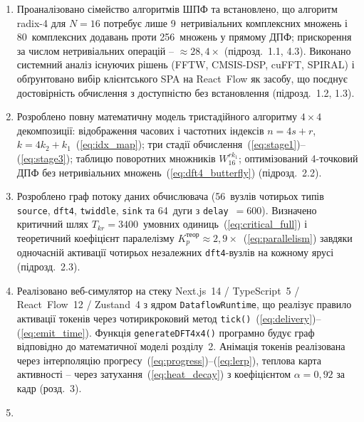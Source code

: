\documentclass[
]{article}
\begin{document}
\begin{enumerate}
\def\labelenumi{\arabic{enumi}.}
\item
  Проаналізовано сімейство алгоритмів ШПФ та встановлено, що алгоритм
  radix-4 для \(N = 16\) потребує лише 9~нетривіальних комплексних
  множень і 80~комплексних додавань проти 256~множень у прямому ДПФ;
  прискорення за числом нетривіальних операцій --
  \(\approx 28,4 \times\) (підрозд.~1.1, 4.3). Виконано системний аналіз
  існуючих рішень (FFTW, CMSIS-DSP, cuFFT, SPIRAL) і обґрунтовано вибір
  клієнтського SPA на React~Flow як засобу, що поєднує достовірність
  обчислення з доступністю без встановлення (підрозд.~1.2, 1.3).
\item
  Розроблено повну математичну модель тристадійного алгоритму
  \(4 \times 4\) декомпозиції: відображення часових і частотних індексів
  \(n = 4s + r\),
  \(k = 4k_{2} + k_{1}\)~(\hyperref[eq:idx_map]{{[}eq:idx\_map{]}}); три
  стадії
  обчислення~(\hyperref[eq:stage1]{{[}eq:stage1{]}})--(\hyperref[eq:stage3]{{[}eq:stage3{]}});
  таблицю поворотних множників \(W_{16}^{rk_{1}}\); оптимізований
  4-точковий ДПФ без нетривіальних
  множень~(\hyperref[eq:dft4_butterfly]{{[}eq:dft4\_butterfly{]}})
  (підрозд.~2.2).
\item
  Розроблено граф потоку даних обчислювача (56~вузлів чотирьох типів
  \texttt{source}, \texttt{dft4}, \texttt{twiddle}, \texttt{sink} та
  64~дуги з \texttt{delay}~\(= 600\)). Визначено критичний шлях
  \(T_{kr} = 3400\)~умовних
  одиниць~(\hyperref[eq:critical_full]{{[}eq:critical\_full{]}}) і
  теоретичний коефіцієнт паралелізму
  \(K_{p}^{\text{теор}} \approx 2,9 \times\)~(\hyperref[eq:parallelism]{{[}eq:parallelism{]}})
  завдяки одночасній активації чотирьох незалежних \texttt{dft4}-вузлів
  на кожному ярусі (підрозд.~2.3).
\item
  Реалізовано веб-симулятор на стеку Next.js~14 / TypeScript~5 /
  React~Flow~12 / Zustand~4 з ядром \texttt{DataflowRuntime}, що
  реалізує правило активації токенів через чотирикроковий метод
  \texttt{tick}\texttt{()}~(\hyperref[eq:delivery]{{[}eq:delivery{]}})--(\hyperref[eq:emit_time]{{[}eq:emit\_time{]}}).
  Функція \texttt{generateDFT4x4()} програмно будує граф відповідно до
  математичної моделі розділу~2. Анімація токенів реалізована через
  інтерполяцію
  прогресу~(\hyperref[eq:progress]{{[}eq:progress{]}})--(\hyperref[eq:lerp]{{[}eq:lerp{]}}),
  теплова карта активності -- через
  затухання~(\hyperref[eq:heat_decay]{{[}eq:heat\_decay{]}}) з
  коефіцієнтом \(\alpha = 0,92\) за кадр (розд.~3).
\item

\end{enumerate}
\end{document}
